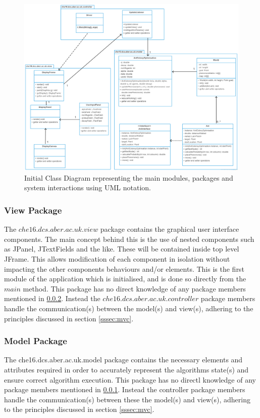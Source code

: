\clearpage
\begin{figure}
\includegraphics[scale=0.225]{Images/diss-uml}
\caption{Initial Class Diagram representing the main modules, packages and system interactions using UML notation.}
\label{fig:classdiagram}
\end{figure}
\clearpage

\subsubsection{View Package}

\label{sssec:view}
The $che16.dcs.aber.ac.uk.view$ package contains the graphical user interface components. The main concept behind this is the use of nested components such as JPanel, JTextFields and the like. These will be contained inside top level JFrame. This allows modification of each component in isolation without impacting the other components behaviours and/or elements. This is the first module of the application which is initialised, and is done so directly from the $main$ method. This package has no direct knowledge of any package members mentioned in \ref{sssec:model}. Instead the $che16.dcs.aber.ac.uk.controller$ package members handle the communication(s) between the model(s) and view(s), adhering to the principles discussed in section \ref{sssec:mvc}.

\subsubsection{Model Package}
\label{sssec:model}
The che16.dcs.aber.ac.uk.model package contains the necessary elements and attributes required in order to accurately represent the algorithms state(s) and ensure correct algorithm execution. This package has no directl knowledge of any package members mentioned in \ref{sssec:view}. Instead the controller package members handle the communication(s) between these the model(s) and view(s), adhering to the principles discussed in section \ref{sssec:mvc}.

